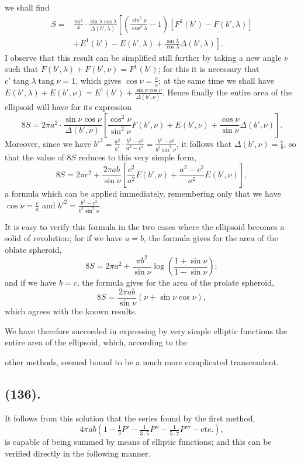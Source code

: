 \documentclass{article}
\begin{document}
we shall find
\[ \begin{aligned} S={}&\frac{\pi a^{2}}{4}\cdot\frac{\sin\lambda\cos\lambda}{\Delta(b',\lambda)}\left[\left(\frac{\sin^{2}\mu}{\cos^{2}\lambda}-1\right)[F^{1}(b')-F(b',\lambda)]\right.\\ &\left.+E^{1}(b')-E(b',\lambda)+\frac{\sin\lambda}{\cos\lambda}\Delta(b',\lambda)\right]. \end{aligned} \]
I observe that this result can be simplified still further by taking a new angle $\nu$ such that $F(b',\lambda)+F(b',\nu)=F^{1}(b')$; for this it is necessary that $c'\operatorname{tang}\lambda\operatorname{tang}\nu=1$, which gives $\cos\nu=\frac{c}{a}$; at the same time we shall have $E(b',\lambda)+E(b',\nu)=E^{1}(b')+\frac{\sin\nu\cos\nu}{\Delta(b',\nu)}$. Hence finally the entire area of the ellipsoid will have for its expression
\[ 8S=2\pi a^{2}\cdot\frac{\sin\nu\cos\nu}{\Delta(b',\nu)}\left[\frac{\cos^{2}\nu}{\sin^{2}\nu}F(b',\nu)+E(b',\nu)+\frac{\cos\nu}{\sin\nu}\Delta(b',\nu)\right]. \]
Moreover, since we have $b'^{2}=\frac{a^{2}}{b^{2}}\cdot\frac{b^{2}-c^{2}}{a^{2}-c^{2}}=\frac{b^{2}-c^{2}}{b^{2}\sin^{2}\nu}$, it follows that $\Delta(b',\nu)=\frac{c}{b}$, so that the value of $8S$ reduces to this very simple form,
\[ 8S=2\pi c^{2}+\frac{2\pi ab}{\sin\nu}\left[\frac{c^{2}}{a^{2}}F(b',\nu)+\frac{a^{2}-c^{2}}{a^{2}}E(b',\nu)\right], \]
a formula which can be applied immediately, remembering only that we have $\cos\nu=\frac{c}{a}$ and $b'^{2}=\frac{b^{2}-c^{2}}{b^{2}\sin^{2}\nu}$.

It is easy to verify this formula in the two cases where the ellipsoid becomes a solid of revolution; for if we have $a=b$, the formula gives for the area of the oblate spheroid,
\[ 8S=2\pi a^{2}+\frac{\pi b^{2}}{\sin\nu}\log\left(\frac{1+\sin\nu}{1-\sin\nu}\right); \]
and if we have $b=c$, the formula gives for the area of the prolate spheroid,
\[ 8S=\frac{2\pi ab}{\sin\nu}(\nu+\sin\nu\cos\nu), \]
which agrees with the known results.

We have therefore succeeded in expressing by very simple elliptic functions the entire area of the ellipsoid, which, according to the

other methods, seemed bound to be a much more complicated transcendent.

\subsection*{(136).}

It follows from this solution that the series found by the first method,
\[ 4\pi ab\left(1-\tfrac{1}{3}P'-\tfrac{1}{3\cdot5}P''-\tfrac{1}{5\cdot7}P'''-\text{etc.}\right), \]
is capable of being summed by means of elliptic functions; and this can be verified directly in the following manner.
\end{document}
